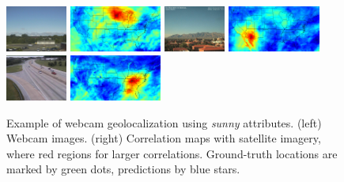 \documentclass[10pt,twocolumn,letterpaper]{article}
\begin{document}
\begin{figure}
	\centering
		\includegraphics[width=0.18\textwidth]{figs/geoloc/297}
		\includegraphics[width=0.27\textwidth]{figs/geoloc/geoloc_8_297}
		\includegraphics[width=0.18\textwidth]{figs/geoloc/5207}
		\includegraphics[width=0.27\textwidth]{figs/geoloc/geoloc_24_5207}
		\includegraphics[width=0.18\textwidth]{figs/geoloc/23573}
		\includegraphics[width=0.27\textwidth]{figs/geoloc/geoloc_152_23573}
		\caption{Example of webcam geolocalization using
          \textit{sunny} attributes. (left) Webcam images. (right)
          Correlation maps with satellite imagery, where red regions
          for larger correlations. Ground-truth locations are marked by green
          dots, predictions by blue stars.}
		\label{fig:geoloc}
\end{figure}
\end{document}
